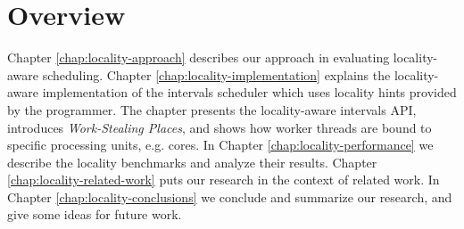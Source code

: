 

\section{Overview}
\label{sec:locality-intro-overview}

Chapter \ref{chap:locality-approach} describes our approach in
evaluating locality-aware scheduling. Chapter
\ref{chap:locality-implementation} explains the locality-aware
implementation of the intervals scheduler which uses locality hints
provided by the programmer. The chapter presents the locality-aware
intervals API, introduces \emph{Work-Stealing Places}, and shows how
worker threads are bound to specific processing units, e.g. cores.  In
Chapter \ref{chap:locality-performance} we describe the locality
benchmarks and analyze their results. Chapter
\ref{chap:locality-related-work} puts our research in the context of
related work. In Chapter \ref{chap:locality-conclusions} we conclude
and summarize our research, and give some ideas for future work.


